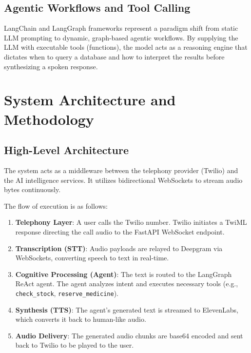 \documentclass[12pt,a4paper]{report}
\begin{document}
\section{Agentic Workflows and Tool Calling}
LangChain and LangGraph frameworks represent a paradigm shift from static LLM prompting to dynamic, graph-based agentic workflows. By supplying the LLM with executable tools (functions), the model acts as a reasoning engine that dictates when to query a database and how to interpret the results before synthesizing a spoken response.

\chapter{System Architecture and Methodology}

\section{High-Level Architecture}
The system acts as a middleware between the telephony provider (Twilio) and the AI intelligence services. It utilizes bidirectional WebSockets to stream audio bytes continuously.

The flow of execution is as follows:
\begin{enumerate}
    \item \textbf{Telephony Layer}: A user calls the Twilio number. Twilio initiates a TwiML response directing the call audio to the FastAPI WebSocket endpoint.
    \item \textbf{Transcription (STT)}: Audio payloads are relayed to Deepgram via WebSockets, converting speech to text in real-time.
    \item \textbf{Cognitive Processing (Agent)}: The text is routed to the LangGraph ReAct agent. The agent analyzes intent and executes necessary tools (e.g., \texttt{check\_stock}, \texttt{reserve\_medicine}).
    \item \textbf{Synthesis (TTS)}: The agent's generated text is streamed to ElevenLabs, which converts it back to human-like audio.
    \item \textbf{Audio Delivery}: The generated audio chunks are base64 encoded and sent back to Twilio to be played to the user.
\end{enumerate}
\end{document}
